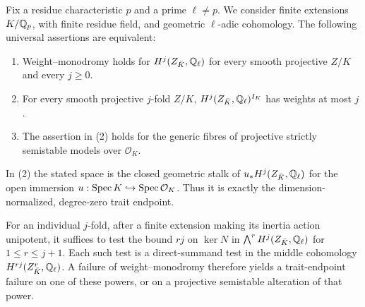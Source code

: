 \begin{theorem}
\label{c:universal-trait-weight-equivalence}
Fix a residue characteristic $p$ and a prime $\ell\ne p$.
We consider finite extensions $K/\mathbb Q_p$, with finite residue
field, and geometric $\ell$-adic cohomology.  The following
universal assertions are equivalent:
\begin{enumerate}
\item Weight--monodromy holds for $H^j(Z_{\bar K},\mathbb Q_\ell)$
for every smooth projective $Z/K$ and every $j\geq0$.
\item For every smooth projective $j$-fold $Z/K$,
$H^j(Z_{\bar K},\mathbb Q_\ell)^{I_K}$ has weights at most $j$.
\item The assertion in (2) holds for the generic fibres of
projective strictly semistable models over $\mathcal O_K$.
\end{enumerate}
In (2) the stated space is the closed geometric stalk of
$u_*H^j(Z_{\bar K},\mathbb Q_\ell)$ for the open immersion
$u:\operatorname{Spec} K\hookrightarrow\operatorname{Spec}\mathcal O_K$.  Thus it is exactly
the dimension-normalized, degree-zero trait endpoint.

For an individual $j$-fold, after a finite extension making its
inertia action unipotent, it suffices to test the bound
$rj$ on $\ker N$ in
$\bigwedge^r H^j(Z_{\bar K},\mathbb Q_\ell)$ for $1\leq r\leq j+1$.
Each such test is a direct-summand test in the middle cohomology
$H^{rj}(Z^r_{\bar K},\mathbb Q_\ell)$.  A failure of weight--monodromy
therefore yields a trait-endpoint failure on one of these powers,
or on a projective semistable alteration of that power.
\end{theorem}

